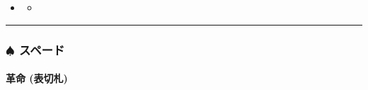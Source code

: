 \documentclass[letterpaper,10pt,dvipdfmx]{sphinxmanual}
\begin{document}
\begin{sphinxShadowBox}
\begin{itemize}
\begin{itemize}
\item {} 
\sphinxAtStartPar
{}\label{\detokenize{auto/frameActionlist:id304}}{\hyperref[\detokenize{auto/frameActionlist:trump-c8}]{}}

\item {} 
\sphinxAtStartPar
{}\label{\detokenize{auto/frameActionlist:id305}}{\hyperref[\detokenize{auto/frameActionlist:trump-c9}]{}}

\item {} 
\sphinxAtStartPar
{}\label{\detokenize{auto/frameActionlist:id306}}{\hyperref[\detokenize{auto/frameActionlist:trump-c10}]{}}

\item {} 
\sphinxAtStartPar
{}\label{\detokenize{auto/frameActionlist:id307}}{\hyperref[\detokenize{auto/frameActionlist:trump-cj}]{}}

\end{itemize}

\item {} 
\sphinxAtStartPar
{}\label{\detokenize{auto/frameActionlist:id308}}{\hyperref[\detokenize{auto/frameActionlist:id143}]{}}
\begin{itemize}
\item {} 
\sphinxAtStartPar
{}\label{\detokenize{auto/frameActionlist:id309}}{\hyperref[\detokenize{auto/frameActionlist:trump-secrettrump}]{}}

\end{itemize}

\end{itemize}
\end{sphinxShadowBox}


\bigskip\hrule\bigskip



\subsubsection{{\normalsize $\spadesuit$} スペード}
\label{\detokenize{auto/frameActionlist:id109}}

\paragraph{革命 (表切札)}
\label{\detokenize{auto/frameActionlist:trump-sa}}\label{\detokenize{auto/frameActionlist:id110}}
\sphinxAtStartPar
{}
\end{document}
